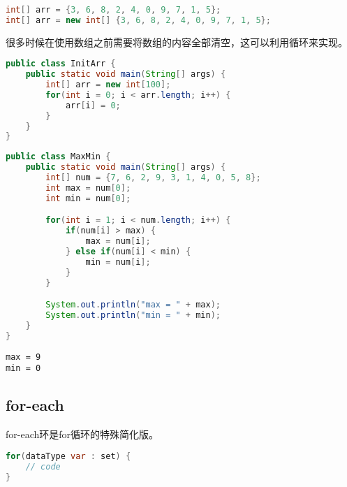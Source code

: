 \vspace{-0.5cm}

\begin{lstlisting}[language=Java]
int[] arr = {3, 6, 8, 2, 4, 0, 9, 7, 1, 5};
int[] arr = new int[] {3, 6, 8, 2, 4, 0, 9, 7, 1, 5};
\end{lstlisting}

很多时候在使用数组之前需要将数组的内容全部清空，这可以利用循环来实现。 \\


\begin{lstlisting}[language=Java]
public class InitArr {
    public static void main(String[] args) {
        int[] arr = new int[100];
        for(int i = 0; i < arr.length; i++) {
            arr[i] = 0;
        }
    }
}
\end{lstlisting}

\vspace{0.5cm}


\begin{lstlisting}[language=Java]
public class MaxMin {
    public static void main(String[] args) {
        int[] num = {7, 6, 2, 9, 3, 1, 4, 0, 5, 8};
        int max = num[0];
        int min = num[0];

        for(int i = 1; i < num.length; i++) {
            if(num[i] > max) {
                max = num[i];
            } else if(num[i] < min) {
                min = num[i];
            }
        }

        System.out.println("max = " + max);
        System.out.println("min = " + min);
    }
}
\end{lstlisting}

\begin{tcolorbox}
	\begin{verbatim}
max = 9
min = 0
	\end{verbatim}
\end{tcolorbox}

\subsection{for-each}

for-each环是for循环的特殊简化版。

\vspace{-0.5cm}

\begin{lstlisting}[language=Java]
for(dataType var : set) {
    // code
}
\end{lstlisting}

